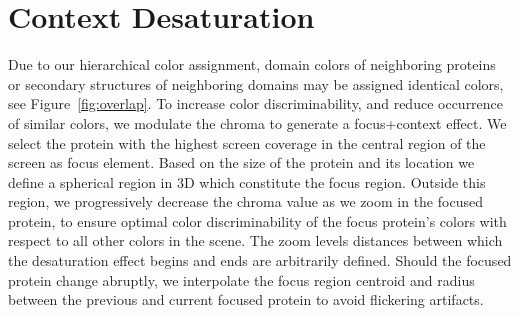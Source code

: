 \documentclass[review,journal]{vgtc}         %
\begin{document}
	
	\section{Context Desaturation}
	\label{sec:chroma}
	
	
	Due to our hierarchical color assignment, domain colors of neighboring proteins or secondary structures of neighboring domains may be assigned identical colors, see Figure~\ref{fig:overlap}.
	To increase color discriminability, and reduce occurrence of similar colors, we modulate the chroma to generate a focus+context effect. 
	We select the protein with the highest screen coverage in the central region of the screen as focus element.
	Based on the size of the protein and its location we define a spherical region in 3D which constitute the focus region.
	Outside this region, we progressively decrease the chroma value as we zoom in the focused protein, to ensure optimal color discriminability of the focus protein's colors with respect to all other colors in the scene. 
	The zoom levels distances between which the desaturation effect begins and ends are arbitrarily defined.
	Should the focused protein change abruptly, we interpolate the focus region centroid and radius between the previous and current focused protein to avoid flickering artifacts.
	
	
	
\end{document}
